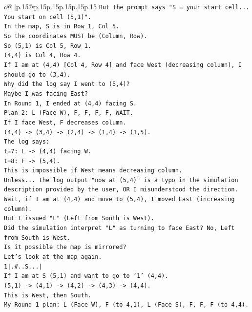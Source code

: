 \documentclass{article}
\begin{document}
{\begin{supertabular}{c@{$\;$}|p{.15\linewidth}@{}p{.15\linewidth}p{.15\linewidth}p{.15\linewidth}p{.15\linewidth}p{.15\linewidth}}
{{{\texttt{But the prompt says "S = your start cell... You start on cell (5,1)".} \\
\texttt{In the map, S is in Row 1, Col 5.} \\
\texttt{So the coordinates MUST be (Column, Row).} \\
\texttt{So (5,1) is Col 5, Row 1.} \\
\texttt{(4,4) is Col 4, Row 4.} \\
\texttt{If I am at (4,4) {[}Col 4, Row 4{]} and face West (decreasing column), I should go to (3,4).} \\
\texttt{Why did the log say I went to (5,4)?} \\
\texttt{Maybe I was facing East?} \\
\texttt{In Round 1, I ended at (4,4) facing S.} \\
\texttt{Plan 2: L (Face W), F, F, F, F, WAIT.} \\
\texttt{If I face West, F decreases column.} \\
\texttt{(4,4) {-}> (3,4) {-}> (2,4) {-}> (1,4) {-}> (1,5).} \\
\texttt{The log says:} \\
\texttt{t=7: L {-}> (4,4) facing W.} \\
\texttt{t=8: F {-}> (5,4).} \\
\texttt{This is impossible if West means decreasing column.} \\
\texttt{Unless... the log output "now at (5,4)" is a typo in the simulation description provided by the user, OR I misunderstood the direction.} \\
\texttt{Wait, if I am at (4,4) and move to (5,4), I moved East (increasing column).} \\
\texttt{But I issued "L" (Left from South is West).} \\
\texttt{Did the simulation interpret "L" as turning to face East? No, Left from South is West.} \\
\texttt{Is it possible the map is mirrored?} \\
\texttt{Let's look at the map again.} \\
\texttt{1|.\#..S...|} \\
\texttt{If I am at S (5,1) and want to go to '1' (4,4).} \\
\texttt{(5,1) {-}> (4,1) {-}> (4,2) {-}> (4,3) {-}> (4,4).} \\
\texttt{This is West, then South.} \\
\texttt{My Round 1 plan: L (Face W), F (to 4,1), L (Face S), F, F, F (to 4,4).} \\
}}}
\end{supertabular}}
\end{document}
